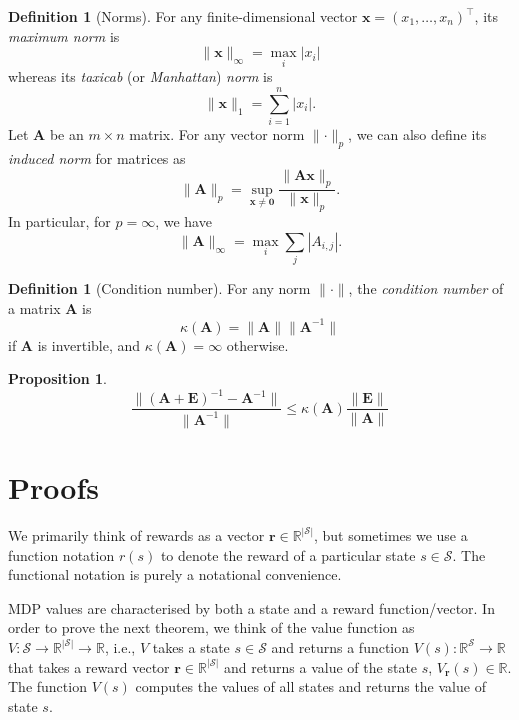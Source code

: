 \documentclass{article}
\newtheorem{proposition}[theorem]{Proposition}
\theoremstyle{definition}
\newtheorem{definition}[theorem]{Definition}
\begin{document}
\begin{definition}[Norms]
  For any finite-dimensional vector $\mathbf{x} = (x_1, \dots, x_n)^\intercal$,
  its \emph{maximum norm} is
  \[
    \lVert \mathbf{x} \rVert_\infty = \max_i |x_i|
  \]
  whereas its \emph{taxicab} (or \emph{Manhattan}) \emph{norm} is
  \[
    \lVert \mathbf{x} \rVert_1 = \sum_{i = 1}^n |x_i|.
  \]
  Let $\mathbf{A}$ be an $m \times n$ matrix. For any vector norm $\lVert
  \cdot \rVert_p$, we can also define its \emph{induced norm} for matrices as
  \[
    \lVert \mathbf{A} \rVert_p = \sup_{\mathbf{x} \ne \mathbf{0}} \frac{\lVert
      \mathbf{Ax} \rVert_p}{\lVert \mathbf{x} \rVert_p}.
  \]
  In particular, for $p = \infty$, we have
  \[
    \lVert \mathbf{A} \rVert_\infty = \max_i \sum_{j} |A_{i,j}|.
  \]
\end{definition}

\begin{definition}[Condition number]
  For any norm $\lVert \cdot \rVert$, the \emph{condition number} of a matrix
  $\mathbf{A}$ is
  \[
    \kappa(\mathbf{A}) = \lVert \mathbf{A} \rVert \lVert \mathbf{A}^{-1} \rVert
  \]
  if $\mathbf{A}$ is invertible, and $\kappa(\mathbf{A}) = \infty$ otherwise.
\end{definition}

\begin{proposition} \label{prop:condition_number}
  \[
    \frac{\lVert (\mathbf{A} + \mathbf{E})^{-1} - \mathbf{A}^{-1} \rVert}{\lVert
    \mathbf{A}^{-1} \rVert} \le \kappa(\mathbf{A})\frac{\lVert \mathbf{E}
    \rVert}{\lVert \mathbf{A} \rVert}
  \]
\end{proposition}

\section{Proofs}

We primarily think of rewards as a vector $\mathbf{r} \in
\mathbb{R}^{|\mathcal{S}|}$, but sometimes we use a function notation $r(s)$ to
denote the reward of a particular state $s \in \mathcal{S}$. The functional
notation is purely a notational convenience.

MDP values are characterised by both a state and a reward function/vector. In
order to prove the next theorem, we think of the value function as $V :
\mathcal{S} \to \mathbb{R}^{|\mathcal{S}|} \to \mathbb{R}$, i.e., $V$ takes a
state $s \in \mathcal{S}$ and returns a function $V(s) :
\mathbb{R}^{\mathcal{S}} \to \mathbb{R}$ that takes a reward vector $\mathbf{r}
\in \mathbb{R}^{|\mathcal{S}|}$ and returns a value of the state $s$,
$V_{\mathbf{r}}(s) \in \mathbb{R}$. The function $V(s)$ computes the values of
all states and returns the value of state $s$.
\end{document}
